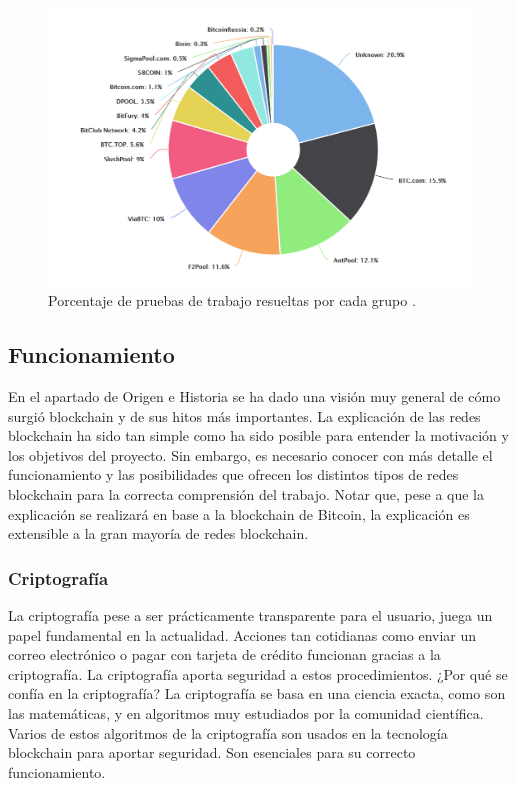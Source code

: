 \begin{figure}
	\centering
	\includegraphics[width=1\textwidth]{imagenes/minninpools.PNG}
	\caption{\label{fig1}Porcentaje de pruebas de trabajo resueltas por cada grupo \cite{blockchaininfo}.}
\end{figure}


\subsection{Funcionamiento}

En el apartado de Origen e Historia se ha dado una visión muy general de cómo surgió blockchain y de sus hitos más importantes. La explicación de las redes blockchain ha sido tan simple como ha sido posible para entender la motivación y los objetivos del proyecto. Sin embargo, es necesario conocer con más detalle el funcionamiento y las posibilidades que ofrecen los distintos tipos de redes blockchain para la correcta comprensión del trabajo. Notar que, pese a que la explicación se realizará en base a la blockchain de Bitcoin, la explicación es extensible a la gran mayoría de redes blockchain.\newline

\subsubsection{Criptografía}

La criptografía pese a ser prácticamente transparente para el usuario, juega un papel fundamental en la actualidad. Acciones tan cotidianas como enviar un correo electrónico o pagar con tarjeta de crédito funcionan gracias a la criptografía. La criptografía aporta seguridad a estos procedimientos. ¿Por qué se confía en la criptografía? La criptografía se basa en una ciencia exacta, como son las matemáticas, y en algoritmos muy estudiados por la comunidad científica. Varios de estos algoritmos de la criptografía son usados en la tecnología blockchain para aportar seguridad. Son esenciales para su correcto funcionamiento.\newline


